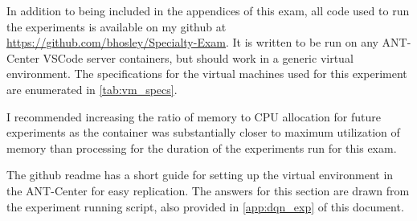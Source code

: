 \documentclass[12pt,letterpaper]{exam}
\begin{document}
In addition to being included in the appendices of this exam,
all code used to run the experiments is available on my github at 
\href{https://github.com/bhosley/Specialty-Exam}{
	https://github.com/bhosley/Specialty-Exam}.
It is written to be run on any ANT-Center VSCode server containers,
but should work in a generic virtual environment.
The specifications for the virtual machines used for this experiment
are enumerated in \cref{tab:vm_specs}.

I recommended increasing the ratio of memory to CPU allocation 
for future experiments as the container was substantially closer
to maximum utilization of memory than processing for the duration
of the experiments run for this exam.

The github readme has a short guide for setting up the virtual
environment in the ANT-Center for easy replication.
The answers for this section are drawn from the experiment running script,
also provided in \cref{app:dqn_exp} of this document.
\end{document}
